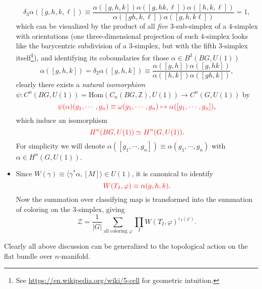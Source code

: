 \documentclass[10pt,nofootinbib,letterpaper]{revtex4}
\def\Z{\mathcal{Z}}
\begin{document}
\begin{itemize}
			\begin{equation}\label{A.4.2}
				\delta_3\alpha([g,h,k,\ell])\equiv\dfrac{\alpha([g,h,k])\alpha([g,hk,\ell])\alpha([h,k,\ell])}{\alpha([gh,k,\ell])\alpha([g,h,k\ell])}=1,
			\end{equation}
			which can be visualized by the product of all \emph{five} $3$-sub-simplex of a $4$-simplex with orientations (one three-dimensional projection of such $4$-simplex looks like the barycentric subdivision of a $3$-simplex, but with the fifth $3$-simplex itself\footnote{See \url{https://en.wikipedia.org/wiki/5-cell} for geometric intuition.}), and identifying its coboundaries for those $\alpha\in B^3(BG,U(1))$
			\begin{equation}\label{A.4.3}
				\alpha([g,h,k])=\delta_2 \alpha([g,h,k])\equiv\dfrac{\alpha([g,h])\alpha([g,hk])}{\alpha([h,k])\alpha([gh,k])},
			\end{equation}
			clearly there exists a \emph{natural isomorphism} \cite{wakui1992dijkgraaf} $\psi:C^n(BG,U(1))=\mathrm{Hom}(C_n(BG,\mathbb{Z}),U(1))\to C^n(G,U(1))$ by
			\begin{equation*}
				{\color{red}\psi(\alpha)(g_1,\cdots,g_n)\equiv \omega(g_1,\cdots,g_n)\mapsto \alpha([g_1,\cdots,g_n])},
			\end{equation*}
			which induce an isomorphism
			\begin{equation*}
				{\color{red}H^n(BG,U(1))\simeq H^n(G,U(1))}.
			\end{equation*}
			For simplicity we will denote $\alpha([g_1,\cdots,g_n])\equiv\alpha(g_1,\cdots,g_n)$ with $\alpha\in H^n(G,U(1))$.
			\item Since $W(\gamma)\equiv\langle\gamma^* \alpha,[M]\rangle\in U(1)$, it is canonical to identify
			\begin{equation}\label{A.4.4}
				{\color{red}W(T_I,\varphi)\equiv\alpha(g,h,k)}.
			\end{equation}
			Now the summation over classifying map is transformed into the summation of coloring on the $3$-simplex, giving
			\begin{equation}\label{A.4.5}
				\Z=\dfrac{1}{|G|}\sum_{\text{all coloring }\varphi}\prod_I W(T_I,\varphi)^{\varepsilon_I(\varphi)}.
			\end{equation}
		\end{itemize}
		Clearly all above discussion can be generalized to the topological action on the flat bundle over $n$-manifold.


	

\end{document}
